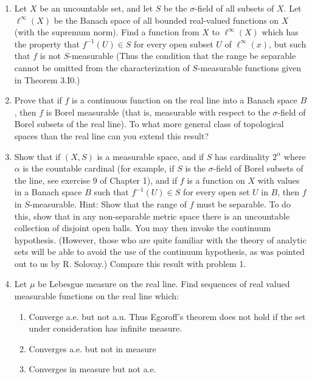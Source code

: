 \begin{enumerate}[label=\arabic*).]
\item Let $X$ be an uncountable set, and let $S$ be the $\sigma$-field of all subsets of $X$. Let $\ell^\infty(X)$ be the Banach space of all bounded real-valued functions on $X$ (with the supremum norm). Find a function from $X$ to $\ell^\infty(X)$ which has the property that $f^{-1}(U) \in S$ for every open subset $U$ of $\ell^\infty(x)$, but such that $f$ is not $S$-measurable (Thus the condition that the range be separable cannot be omitted from the characterization of $S$-measurable functions given in Theorem 3.I0.)

\item Prove that if $f$ is a continuous function on the real line into a Banach space $B$, then $f$ is Borel measurable (that is, measurable with respect to the $\sigma$-field of Borel subsets of the real line). To what more general class of topological spaces than the real line can you extend this result?

\item Show that if $(X, S)$ is a measurable space, and if $S$ has cardinality $2^\alpha$ where $\alpha$ is the countable cardinal (for example, if $S$ is the $\sigma$-field of Borel subsets of the line, see exercise 9 of Chapter 1), and if $f$ is a function on $X$ with values in a Banach space $B$ such that $f^{-1}(U) \in S$ for every open set $U$ in $B$, then $f$ in $S$-measurable. Hint: Show that the range of $f$ must be separable. To do this, show that in any non-separable metric space there is an uncountable collection of disjoint open balls. You may then invoke the continuum hypothesis. (However, those who are quite familiar with the theory of analytic sets will be able to avoid the use of the continuum hypothesis, as was pointed out to us by R. Solovay.) Compare this result with problem 1.

\item Let $\mu$ be Lebesgue measure on the real line. Find sequences of real valued measurable functions on the real line which:
\begin{enumerate}
    \item Converge a.e. but not a.u. Thus Egoroff's theorem does not hold if the set under consideration has infinite measure.
    \item Converges a.e. but not in measure
    \item Converges in measure but not a.e.
\end{enumerate}


\end{enumerate}
